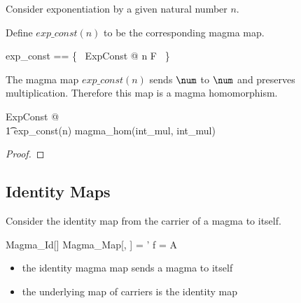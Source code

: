 \documentclass{amsart}
\begin{document}
\begin{example}

Consider exponentiation by a given natural number $n$.


Define $exp\_const(n)$ to be the corresponding magma map.

\begin{zed}
	exp\_const == \{~ ExpConst @ n \mapsto F ~\}
\end{zed}

The magma map $exp\_const(n)$ sends $\num$ to $\num$ and preserves multiplication.
Therefore this map is a magma homomorphism.

\begin{zed}
	\forall ExpConst @ \\
	\t1	exp\_const(n) \in magma\_hom(int\_mul, int\_mul)
\end{zed}

\begin{proof}
\end{proof}

\end{example}

\subsection{Identity Maps}

Consider the identity map from the carrier of a magma to itself.

\begin{schema}{Magma\_Id}[\genT]
	Magma\_Map[\genT, \genT]
\where
	\strucA = \strucA'
\also
	f = \id A
\end{schema}

\begin{itemize}
	\item the identity magma map sends a magma to itself
	\item the underlying map of carriers is the identity map
\end{itemize}
\end{document}
